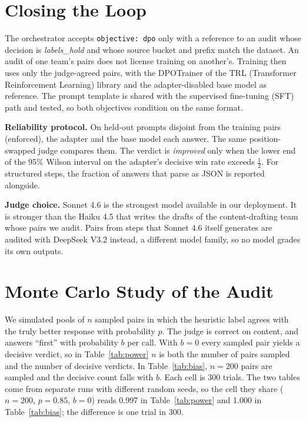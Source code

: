 \documentclass[conference]{IEEEtran}
\theoremstyle{remark}
\begin{document}
\section{Closing the Loop}\label{sec:loop}
The orchestrator accepts \texttt{objective: dpo} only with a reference to an audit whose decision is \emph{labels\_hold} and whose source bucket and prefix match the dataset. An audit of one team's pairs does not license training on another's. Training then uses only the judge-agreed pairs, with the DPOTrainer of the TRL (Transformer Reinforcement Learning) library and the adapter-disabled base model as reference. The prompt template is shared with the supervised fine-tuning (SFT) path and tested, so both objectives condition on the same format.

\textbf{Reliability protocol.} On held-out prompts disjoint from the training pairs (enforced), the adapter and the base model each answer. The same position-swapped judge compares them. The verdict is \emph{improved} only when the lower end of the 95\% Wilson interval on the adapter's decisive win rate exceeds $\tfrac12$. For structured steps, the fraction of answers that parse as JSON is reported alongside.

\textbf{Judge choice.} Sonnet 4.6 is the strongest model available in our deployment. It is stronger than the Haiku 4.5 that writes the drafts of the content-drafting team whose pairs we audit. Pairs from steps that Sonnet 4.6 itself generates are audited with DeepSeek V3.2 instead, a different model family, so no model grades its own outputs.

\section{Monte Carlo Study of the Audit}\label{sec:mc}
We simulated pools of $n$ sampled pairs in which the heuristic label agrees with the truly better response with probability $p$. The judge is correct on content, and answers ``first'' with probability $b$ per call. With $b=0$ every sampled pair yields a decisive verdict, so in Table~\ref{tab:power} $n$ is both the number of pairs sampled and the number of decisive verdicts. In Table~\ref{tab:bias}, $n=200$ pairs are sampled and the decisive count falls with $b$. Each cell is 300 trials. The two tables come from separate runs with different random seeds, so the cell they share ($n=200$, $p=0.85$, $b=0$) reads 0.997 in Table~\ref{tab:power} and 1.000 in Table~\ref{tab:bias}; the difference is one trial in 300.
\end{document}
